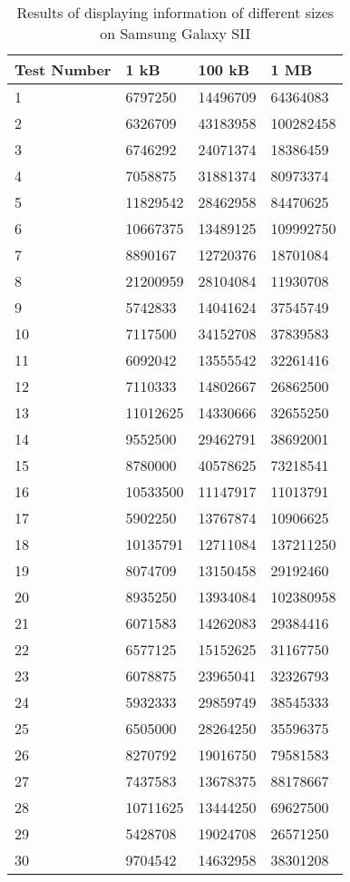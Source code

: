 	\begin{table}[ht!]
    		\caption{Results of displaying information of different sizes on Samsung Galaxy SII} \label{tab:distamceGoogleGlassFull}
		\centering \begin{tabularx}{\textwidth}{l|X|X|X} \hline
		\textbf{Test Number} & \textbf{1 kB} & \textbf{100 kB} & \textbf{1 MB} \\ \hline \hline
       
		1&	6797250	&	14496709	&	64364083		\\ \hline
		2&	6326709	&	43183958	&	100282458	\\ \hline
		3&	6746292	&	24071374	&	18386459		\\ \hline
		4&	7058875	&	31881374	&	80973374		\\ \hline
		5&	11829542	&	28462958	&	84470625		\\ \hline
		6&	10667375	&	13489125	&	109992750	\\ \hline
		7&	8890167	&	12720376	&	18701084		\\ \hline
		8&	21200959	&	28104084	&	11930708		\\ \hline
		9&	5742833	&	14041624	&	37545749		\\ \hline
		10&	7117500	&	34152708	&	37839583		\\ \hline
		11&	6092042	&	13555542	&	32261416		\\ \hline
		12&	7110333	&	14802667	&	26862500		\\ \hline
		13&	11012625	&	14330666	&	32655250		\\ \hline
		14&	9552500	&	29462791	&	38692001		\\ \hline
		15&	8780000	&	40578625	&	73218541		\\ \hline
		16&	10533500	&	11147917	&	11013791		\\ \hline
		17&	5902250	&	13767874	&	10906625		\\ \hline
		18&	10135791	&	12711084	&	137211250	\\ \hline
		19&	8074709	&	13150458	&	29192460		\\ \hline
		20&	8935250	&	13934084	&	102380958	\\ \hline
		21&	6071583	&	14262083	&	29384416		\\ \hline
		22&	6577125	&	15152625	&	31167750		\\ \hline
		23&	6078875	&	23965041	&	32326793		\\ \hline
		24&	5932333	&	29859749	&	38545333		\\ \hline
		25&	6505000	&	28264250	&	35596375		\\ \hline
		26&	8270792	&	19016750	&	79581583		\\ \hline
		27&	7437583	&	13678375	&	88178667		\\ \hline
		28&	10711625	&	13444250	&	69627500		\\ \hline
		29&	5428708	&	19024708	&	26571250		\\ \hline
		30&	9704542	&	14632958	&	38301208		\\ \hline

		\end{tabularx}
	\end{table}
	
